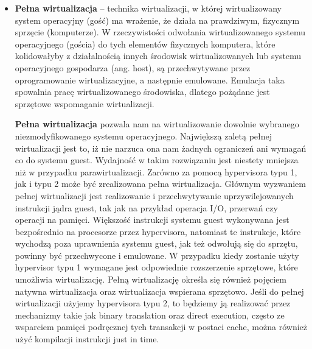 \begin{itemize}
	\item \textbf{Pełna wirtualizacja} – technika wirtualizacji, w której wirtualizowany system operacyjny (gość) ma wrażenie, że działa na prawdziwym, fizycznym sprzęcie (komputerze). W rzeczywistości odwołania wirtualizowanego systemu operacyjnego (gościa) do tych elementów fizycznych komputera, które kolidowałyby z działalnością innych środowisk wirtualizowanych lub systemu operacyjnego gospodarza (ang. host), są przechwytywane przez oprogramowanie wirtualizacyjne, a następnie emulowane. Emulacja taka spowalnia pracę wirtualizowanego środowiska, dlatego pożądane jest sprzętowe wspomaganie wirtualizacji.
	
	\textbf{Pełna wirtualizacja} pozwala nam na wirtualizowanie dowolnie wybranego niezmodyfikowanego systemu operacyjnego. Największą zaletą pełnej wirtualizacji jest to, iż nie narzuca ona nam żadnych ograniczeń ani wymagań co do systemu guest. Wydajność w takim rozwiązaniu jest niestety mniejsza niż w przypadku parawirtualizacji. Zarówno za pomocą hypervisora typu 1, jak i typu 2 może być zrealizowana pełna wirtualizacja. Głównym wyzwaniem pełnej wirtualizacji jest realizowanie i przechwytywanie uprzywilejowanych instrukcji jądra guest, tak jak na przykład operacja I/O, przerwań czy operacji na pamięci. Większość instrukcji systemu guest wykonywana jest bezpośrednio na procesorze przez hypervisora, natomiast te instrukcje, które wychodzą poza uprawnienia systemu guest, jak też odwołują się do sprzętu, powinny być przechwycone i emulowane. W przypadku kiedy zostanie użyty hypervisor typu 1 wymagane jest odpowiednie rozszerzenie sprzętowe, które umożliwia wirtualizację. Pełną wirtualizację określa się również pojęciem natywna wirtualizacja oraz wirtualizacja wspierana sprzętowo. Jeśli do pełnej wirtualizacji użyjemy hypervisora typu 2, to będziemy ją realizować przez mechanizmy takie jak binary translation oraz direct execution, często ze wsparciem pamięci podręcznej tych transakcji w postaci cache, można również użyć kompilacji instrukcji just in time.
\end{itemize}

